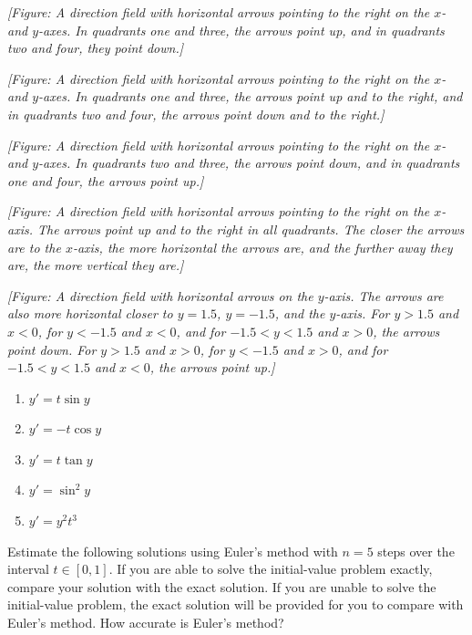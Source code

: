 \documentclass{exercises}
\begin{document}
\textit{[Figure: A direction field with horizontal arrows pointing to the right on the $x$- and $y$-axes. In quadrants one and three, the arrows point up, and in quadrants two and four, they point down.]}


\textit{[Figure: A direction field with horizontal arrows pointing to the right on the $x$- and $y$-axes. In quadrants one and three, the arrows point up and to the right, and in quadrants two and four, the arrows point down and to the right.]}


\textit{[Figure: A direction field with horizontal arrows pointing to the right on the $x$- and $y$-axes. In quadrants two and three, the arrows point down, and in quadrants one and four, the arrows point up.]}


\textit{[Figure: A direction field with horizontal arrows pointing to the right on the $x$-axis. The arrows point up and to the right in all quadrants. The closer the arrows are to the $x$-axis, the more horizontal the arrows are, and the further away they are, the more vertical they are.]}


\textit{[Figure: A direction field with horizontal arrows on the $y$-axis. The arrows are also more horizontal closer to $y=1.5$, $y=-1.5$, and the $y$-axis. For $y>1.5$ and $x<0$, for $y<-1.5$ and $x<0$, and for $-1.5<y<1.5$ and $x>0$, the arrows point down. For $y>1.5$ and $x>0$, for $y<-1.5$ and $x>0$, and for $-1.5<y<1.5$ and $x<0$, the arrows point up.]}

\begin{enumerate}[resume]
\item $y'=t\sin y$
\item $y'=-t\cos y$
\item $y'=t\tan y$
\item $y'=\sin^{2}y$
\item $y'=y^{2}t^{3}$
\end{enumerate}

Estimate the following solutions using Euler's method with $n=5$ steps over the interval $t\in[0,1]$. If you are able to solve the initial-value problem exactly, compare your solution with the exact solution. If you are unable to solve the initial-value problem, the exact solution will be provided for you to compare with Euler's method. How accurate is Euler's method?
\end{document}
